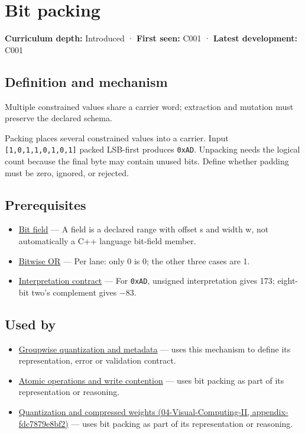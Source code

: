 \hypertarget{appendix-1f9963e1a5d1}{}
\section{Bit packing}\label{appendix-1f9963e1a5d1-bit-packing}

\textbf{Curriculum depth:} Introduced · \textbf{First seen:} C001 · \textbf{Latest development:} C001

\subsection{Definition and mechanism}\label{appendix-1f9963e1a5d1-definition-and-mechanism}

Multiple constrained values share a carrier word; extraction and mutation must preserve the declared schema.

Packing places several constrained values into a carrier. Input \texttt{{[}1,0,1,1,0,1,0,1{]}} packed LSB-first produces \texttt{0xAD}. Unpacking needs the logical count because the final byte may contain unused bits. Define whether padding must be zero, ignored, or rejected.

\subsection{Prerequisites}\label{appendix-1f9963e1a5d1-prerequisites}

\begin{itemize}
\tightlist
\item
  \hyperref[appendix-ac697f5c66e8]{Bit field} --- A field is a declared range with offset s and width w, not automatically a C++ language bit-field member.
\item
  \hyperref[appendix-a427ce8ce8a6]{Bitwise OR} --- Per lane: only 0 is 0; the other three cases are 1.
\item
  \hyperref[appendix-f414bd4ed05c]{Interpretation contract} --- For \texttt{0xAD}, unsigned interpretation gives 173; eight-bit two's complement gives −83.
\end{itemize}

\subsection{Used by}\label{appendix-1f9963e1a5d1-used-by}

\begin{itemize}
\item
  \hyperref[appendix-638204c40e8b]{Groupwise quantization and metadata} --- uses this mechanism to define its representation, error or validation contract.
\item
  \hyperref[appendix-e12d1b03fefb]{Atomic operations and write contention} --- uses bit packing as part of its representation or reasoning.
\item
  \href{../04-Visual-Computing-II/main.pdf\#nameddest=appendix-fdc7879e8bf2}{Quantization and compressed weights (04-Visual-Computing-II, appendix-fdc7879e8bf2)} --- uses bit packing as part of its representation or reasoning.
\end{itemize}

